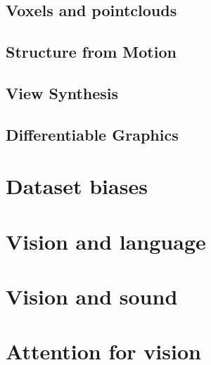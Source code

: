 \documentclass[../main.tex]{subfiles}
\begin{document}
\subsection{Voxels and pointclouds}
\subsection{Structure from Motion}
\subsection{View Synthesis}
\subsection{Differentiable Graphics}

\section{Dataset biases}

\section{Vision and language}

\section{Vision and sound}

\section{Attention for vision}
\end{document}
